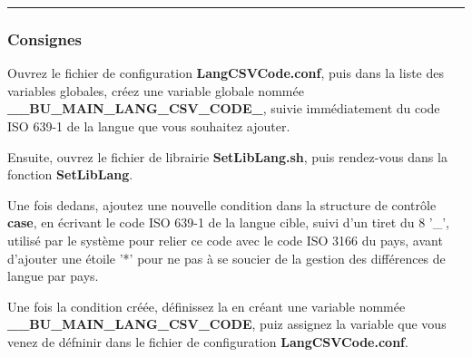 \documentclass[a4paper,10pt]{article}
\begin{document}


    \color{sec3}\par\noindent\rule{\textwidth}{0.4pt}\color{text}

    \color{sec3}
    \subsubsection{Consignes}\color{text}

    \begin{justify}
        Ouvrez le fichier de configuration \textbf{\color{path}LangCSVCode.conf}, puis dans la liste des variables globales, créez une variable globale nommée \textbf{\color{vars}\_\_BU\_MAIN\_LANG\_CSV\_CODE\_}, suivie immédiatement du code ISO 639-1 de la langue que vous souhaitez ajouter.
    \end{justify}

    \begin{justify}
        Ensuite, ouvrez le fichier de librairie \textbf{\color{path}SetLibLang.sh}, puis rendez-vous dans la fonction \textbf{\color{mauve}SetLibLang}.
    \end{justify}

    \begin{justify}
        Une fois dedans, ajoutez une nouvelle condition dans la structure de contrôle \textbf{case}, en écrivant le code ISO 639-1 de la langue cible, suivi d'un tiret du 8 '\_', utilisé par le système pour relier ce code avec le code ISO 3166 du pays, avant d'ajouter une étoile '*' pour ne pas à se soucier de la gestion des différences de langue par pays.
    \end{justify}

    \begin{justify}
        Une fois la condition créée, définissez la en créant une variable nommée \textbf{\color{vars}\_\_BU\_MAIN\_LANG\_CSV\_CODE}, puiz assignez la variable que vous venez de défninir dans le fichier de configuration \textbf{\color{path}LangCSVCode.conf}.
    \end{justify}
\end{document}
